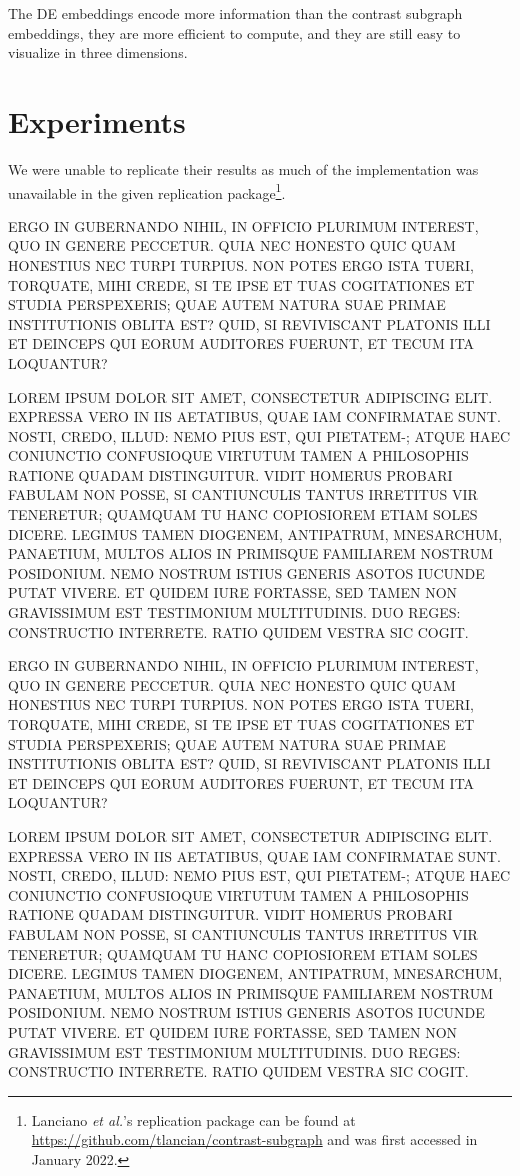 \documentclass[letterpaper]{article}
\begin{document}
The DE embeddings encode more information than the contrast subgraph embeddings, they are more efficient to compute, and they are still easy to visualize in three dimensions.



\section{Experiments}

We were unable to replicate their results as much of the implementation was unavailable in the given replication package\footnote{Lanciano \emph{et al.}'s replication package can be found at \url{https://github.com/tlancian/contrast-subgraph} and was first accessed in January 2022.}.

ERGO IN GUBERNANDO NIHIL, IN OFFICIO PLURIMUM INTEREST, QUO IN GENERE PECCETUR. QUIA NEC HONESTO QUIC QUAM HONESTIUS NEC TURPI TURPIUS. NON POTES ERGO ISTA TUERI, TORQUATE, MIHI CREDE, SI TE IPSE ET TUAS COGITATIONES ET STUDIA PERSPEXERIS; QUAE AUTEM NATURA SUAE PRIMAE INSTITUTIONIS OBLITA EST? QUID, SI REVIVISCANT PLATONIS ILLI ET DEINCEPS QUI EORUM AUDITORES FUERUNT, ET TECUM ITA LOQUANTUR?

LOREM IPSUM DOLOR SIT AMET, CONSECTETUR ADIPISCING ELIT. EXPRESSA VERO IN IIS AETATIBUS, QUAE IAM CONFIRMATAE SUNT. NOSTI, CREDO, ILLUD: NEMO PIUS EST, QUI PIETATEM-; ATQUE HAEC CONIUNCTIO CONFUSIOQUE VIRTUTUM TAMEN A PHILOSOPHIS RATIONE QUADAM DISTINGUITUR. VIDIT HOMERUS PROBARI FABULAM NON POSSE, SI CANTIUNCULIS TANTUS IRRETITUS VIR TENERETUR; QUAMQUAM TU HANC COPIOSIOREM ETIAM SOLES DICERE. LEGIMUS TAMEN DIOGENEM, ANTIPATRUM, MNESARCHUM, PANAETIUM, MULTOS ALIOS IN PRIMISQUE FAMILIAREM NOSTRUM POSIDONIUM. NEMO NOSTRUM ISTIUS GENERIS ASOTOS IUCUNDE PUTAT VIVERE. ET QUIDEM IURE FORTASSE, SED TAMEN NON GRAVISSIMUM EST TESTIMONIUM MULTITUDINIS. DUO REGES: CONSTRUCTIO INTERRETE. RATIO QUIDEM VESTRA SIC COGIT.

ERGO IN GUBERNANDO NIHIL, IN OFFICIO PLURIMUM INTEREST, QUO IN GENERE PECCETUR. QUIA NEC HONESTO QUIC QUAM HONESTIUS NEC TURPI TURPIUS. NON POTES ERGO ISTA TUERI, TORQUATE, MIHI CREDE, SI TE IPSE ET TUAS COGITATIONES ET STUDIA PERSPEXERIS; QUAE AUTEM NATURA SUAE PRIMAE INSTITUTIONIS OBLITA EST? QUID, SI REVIVISCANT PLATONIS ILLI ET DEINCEPS QUI EORUM AUDITORES FUERUNT, ET TECUM ITA LOQUANTUR?

LOREM IPSUM DOLOR SIT AMET, CONSECTETUR ADIPISCING ELIT. EXPRESSA VERO IN IIS AETATIBUS, QUAE IAM CONFIRMATAE SUNT. NOSTI, CREDO, ILLUD: NEMO PIUS EST, QUI PIETATEM-; ATQUE HAEC CONIUNCTIO CONFUSIOQUE VIRTUTUM TAMEN A PHILOSOPHIS RATIONE QUADAM DISTINGUITUR. VIDIT HOMERUS PROBARI FABULAM NON POSSE, SI CANTIUNCULIS TANTUS IRRETITUS VIR TENERETUR; QUAMQUAM TU HANC COPIOSIOREM ETIAM SOLES DICERE. LEGIMUS TAMEN DIOGENEM, ANTIPATRUM, MNESARCHUM, PANAETIUM, MULTOS ALIOS IN PRIMISQUE FAMILIAREM NOSTRUM POSIDONIUM. NEMO NOSTRUM ISTIUS GENERIS ASOTOS IUCUNDE PUTAT VIVERE. ET QUIDEM IURE FORTASSE, SED TAMEN NON GRAVISSIMUM EST TESTIMONIUM MULTITUDINIS. DUO REGES: CONSTRUCTIO INTERRETE. RATIO QUIDEM VESTRA SIC COGIT.
\end{document}
